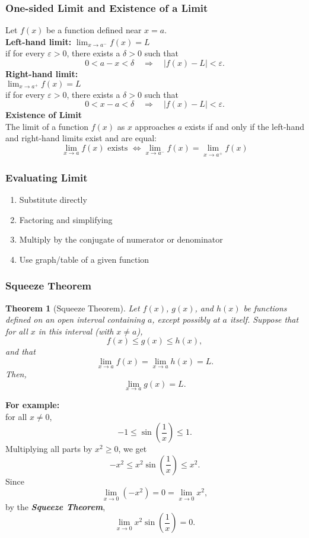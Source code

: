 \documentclass[11pt]{article}
\newtheorem{theorem}{Theorem}[section]
\begin{document}
\subsubsection{One-sided Limit and Existence of a Limit}
Let $f(x)$ be a function defined near $x = a$.\\[.5em]
\noindent
\textbf{Left-hand limit:}  
$
    \displaystyle
    \lim_{x \to a^-}f(x) = L
$\\
if for every $\varepsilon > 0$, there exists a $\delta > 0$ such that
\[
    0<a-x<\delta\quad\Rightarrow\quad|f(x)-L|<\varepsilon.
\]
\noindent
\textbf{Right-hand limit:}\\
$
    \lim_{x \to a^+} f(x) = L
$\\
if for every $\varepsilon > 0$, there exists a $\delta > 0$ such that
\[
    0<x-a<\delta\quad\Rightarrow\quad|f(x)-L|<\varepsilon.
\]
\textbf{Existence of Limit}\\
The limit of a function $f(x)$ as $x$ approaches $a$ exists if and only if the left-hand and right-hand limits exist and are equal:
\[
    \lim_{x \to a} f(x) \text{ exists } \iff \lim_{x \to a^-} f(x) = \lim_{x \to a^+} f(x)
\]
\subsubsection{Evaluating Limit}
\begin{enumerate}
    \item Substitute directly
    \item Factoring and simplifying
    \item Multiply by the conjugate of numerator or denominator
    \item Use graph/table of a given function
\end{enumerate}
\subsubsection{Squeeze Theorem}
\begin{theorem}[Squeeze Theorem]
Let $f(x)$, $g(x)$, and $h(x)$ be functions defined on an open interval containing $a$, 
except possibly at $a$ itself. Suppose that for all $x$ in this interval (with $x \ne a$),
\[f(x) \le g(x) \le h(x),\]
and that\[\lim_{x \to a} f(x) = \lim_{x \to a} h(x) = L.\] 
Then,\[\lim_{x \to a} g(x) = L.\]
\end{theorem}

\bigskip
\noindent
\textbf{For example:}\\
for all $x \ne 0$,
\[
-1 \le \sin\left(\frac{1}{x}\right) \le 1.
\]
Multiplying all parts by $x^2 \ge 0$, we get
\[-x^2 \le x^2 \sin\left(\frac{1}{x}\right) \le x^2.\]
Since
\[\lim_{x \to 0} (-x^2) = 0 = \lim_{x \to 0} x^2,\]
by the \textbf{\textit{Squeeze Theorem}},
\[\lim_{x \to 0} x^2 \sin\left(\frac{1}{x}\right) = 0.\]
\end{document}

